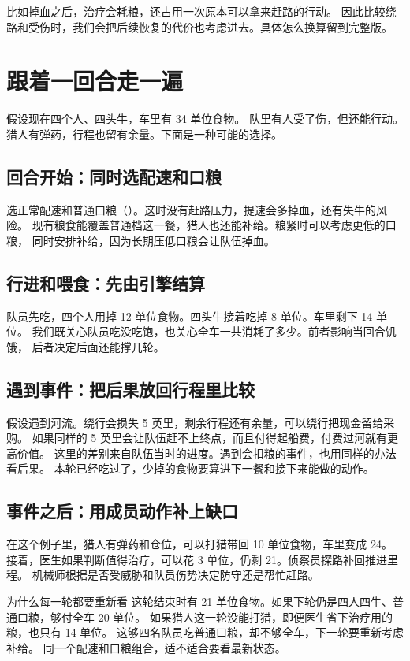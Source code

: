 \documentclass[UTF8,11pt,a4paper]{ctexart}
\begin{document}
比如掉血之后，治疗会耗粮，还占用一次原本可以拿来赶路的行动。
因此比较绕路和受伤时，我们会把后续恢复的代价也考虑进去。具体怎么换算留到完整版。

\clearpage
\section{跟着一回合走一遍}

\noindent 假设现在四个人、四头牛，车里有 34 单位食物。
队里有人受了伤，但还能行动。猎人有弹药，行程也留有余量。下面是一种可能的选择。

\subsection{回合开始：同时选配速和口粮}

选正常配速和普通口粮（）。这时没有赶路压力，提速会多掉血，还有失牛的风险。
现有粮食能覆盖普通档这一餐，猎人也还能补给。粮紧时可以考虑更低的口粮，
同时安排补给，因为长期压低口粮会让队伍掉血。

\subsection{行进和喂食：先由引擎结算}

队员先吃，四个人用掉 12 单位食物。四头牛接着吃掉 8 单位。车里剩下 14 单位。
我们既关心队员吃没吃饱，也关心全车一共消耗了多少。前者影响当回合饥饿，
后者决定后面还能撑几轮。

\subsection{遇到事件：把后果放回行程里比较}

假设遇到河流。绕行会损失 5 英里，剩余行程还有余量，可以绕行把现金留给采购。
如果同样的 5 英里会让队伍赶不上终点，而且付得起船费，付费过河就有更高价值。
这里的差别来自队伍当时的进度。遇到会扣粮的事件，也用同样的办法看后果。
本轮已经吃过了，少掉的食物要算进下一餐和接下来能做的动作。

\subsection{事件之后：用成员动作补上缺口}

在这个例子里，猎人有弹药和仓位，可以打猎带回 10 单位食物，车里变成 24。
接着，医生如果判断值得治疗，可以花 3 单位，仍剩 21。侦察员探路补回推进里程。
机械师根据是否受威胁和队员伤势决定防守还是帮忙赶路。

\begin{keybox}{为什么每一轮都要重新看}
这轮结束时有 21 单位食物。如果下轮仍是四人四牛、普通口粮，够付全车 20 单位。
如果猎人这一轮没能打猎，即便医生省下治疗用的粮，也只有 14 单位。
这够四名队员吃普通口粮，却不够全车，下一轮要重新考虑补给。
同一个配速和口粮组合，适不适合要看最新状态。
\end{keybox}
\end{document}

